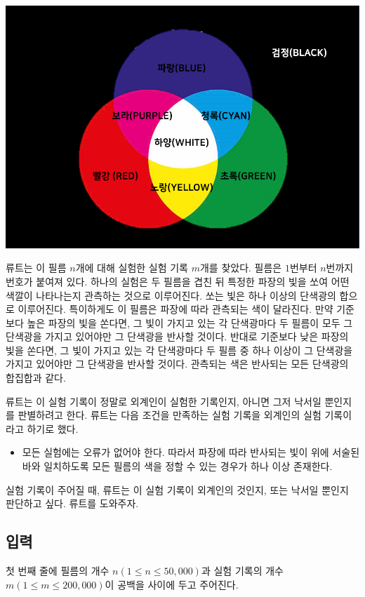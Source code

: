 \documentclass{article}
\begin{document}
\begin{center}
	\includegraphics[scale=0.3]{images/01.png}
\end{center}

류트는 이 필름 $n$개에 대해 실험한 실험 기록 $m$개를 찾았다. 필름은 $1$번부터 $n$번까지 번호가 붙여져 있다. 하나의 실험은 두 필름을 겹친 뒤 특정한 파장의 빛을 쏘여 어떤 색깔이 나타나는지 관측하는 것으로 이루어진다. 쏘는 빛은 하나 이상의 단색광의 합으로 이루어진다. 특이하게도 이 필름은 파장에 따라 관측되는 색이 달라진다. 만약 기준보다 높은 파장의 빛을 쏜다면, 그 빛이 가지고 있는 각 단색광마다 두 필름이 모두 그 단색광을 가지고 있어야만 그 단색광을 반사할 것이다. 반대로 기준보다 낮은 파장의 빛을 쏜다면, 그 빛이 가지고 있는 각 단색광마다 두 필름 중 하나 이상이 그 단색광을 가지고 있어야만 그 단색광을 반사할 것이다. 관측되는 색은 반사되는 모든 단색광의 합집합과 같다.\newline

류트는 이 실험 기록이 정말로 외계인이 실험한 기록인지, 아니면 그저 낙서일 뿐인지를 판별하려고 한다. 류트는 다음 조건을 만족하는 실험 기록을 외계인의 실험 기록이라고 하기로 했다.

\begin{itemize}
	\item 모든 실험에는 오류가 없어야 한다. 따라서 파장에 따라 반사되는 빛이 위에 서술된 바와 일치하도록 모든 필름의 색을 정할 수 있는 경우가 하나 이상 존재한다.
\end{itemize}

실험 기록이 주어질 때, 류트는 이 실험 기록이 외계인의 것인지, 또는 낙서일 뿐인지 판단하고 싶다. 류트를 도와주자.

\subsection{입력}
첫 번째 줄에 필름의 개수 $n(1\le n\le 50,000)$과 실험 기록의 개수 $m(1\le m\le 200,000)$이 공백을 사이에 두고 주어진다.\newline
\end{document}
